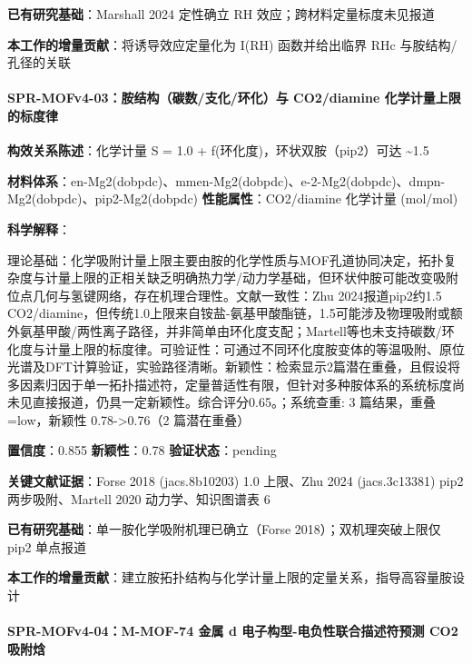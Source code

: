 \documentclass[12pt,a4paper]{ctexart}
\begin{document}
\textbf{已有研究基础}：Marshall 2024 定性确立 RH 效应；跨材料定量标度未见报道

\textbf{本工作的增量贡献}：将诱导效应定量化为 I(RH) 函数并给出临界 RHc 与胺结构/孔径的关联

\paragraph{SPR-MOFv4-03：胺结构（碳数/支化/环化）与 CO2/diamine 化学计量上限的标度律}\label{spr-mofv4-03ux80faux7ed3ux6784ux78b3ux6570ux652fux5316ux73afux5316ux4e0e-co2diamine-ux5316ux5b66ux8ba1ux91cfux4e0aux9650ux7684ux6807ux5ea6ux5f8b}

\textbf{构效关系陈述}：化学计量 S = 1.0 + f(环化度)，环状双胺（pip2）可达 \textasciitilde1.5

\textbf{材料体系}：en-Mg2(dobpdc)、mmen-Mg2(dobpdc)、e-2-Mg2(dobpdc)、dmpn-Mg2(dobpdc)、pip2-Mg2(dobpdc) \textbar{} \textbf{性能属性}：CO2/diamine 化学计量 (mol/mol)

\textbf{科学解释}：

理论基础：化学吸附计量上限主要由胺的化学性质与MOF孔道协同决定，拓扑复杂度与计量上限的正相关缺乏明确热力学/动力学基础，但环状仲胺可能改变吸附位点几何与氢键网络，存在机理合理性。文献一致性：Zhu 2024报道pip2约1.5 CO2/diamine，但传统1.0上限来自铵盐-氨基甲酸酯链，1.5可能涉及物理吸附或额外氨基甲酸/两性离子路径，并非简单由环化度支配；Martell等也未支持碳数/环化度与计量上限的标度律。可验证性：可通过不同环化度胺变体的等温吸附、原位光谱及DFT计算验证，实验路径清晰。新颖性：检索显示2篇潜在重叠，且假设将多因素归因于单一拓扑描述符，定量普适性有限，但针对多种胺体系的系统标度尚未见直接报道，仍具一定新颖性。综合评分0.65。；系统查重: 3 篇结果，重叠=low，新颖性 0.78-\textgreater0.76（2 篇潜在重叠）

\textbf{置信度}：0.855 \textbar{} \textbf{新颖性}：0.78 \textbar{} \textbf{验证状态}：pending

\textbf{关键文献证据}：Forse 2018 (jacs.8b10203) 1.0 上限、Zhu 2024 (jacs.3c13381) pip2 两步吸附、Martell 2020 动力学、知识图谱表 6

\textbf{已有研究基础}：单一胺化学吸附机理已确立（Forse 2018）；双机理突破上限仅 pip2 单点报道

\textbf{本工作的增量贡献}：建立胺拓扑结构与化学计量上限的定量关系，指导高容量胺设计

\paragraph{SPR-MOFv4-04：M-MOF-74 金属 d 电子构型-电负性联合描述符预测 CO2 吸附焓}\label{spr-mofv4-04m-mof-74-ux91d1ux5c5e-d-ux7535ux5b50ux6784ux578b-ux7535ux8d1fux6027ux8054ux5408ux63cfux8ff0ux7b26ux9884ux6d4b-co2-ux5438ux9644ux7113}
\end{document}
